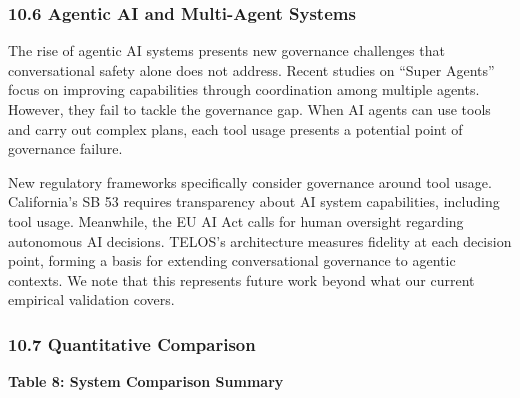 \subsubsection{10.6 Agentic AI and Multi-Agent
Systems}\label{agentic-ai-and-multi-agent-systems}

The rise of agentic AI systems presents new governance challenges that
conversational safety alone does not address. Recent studies on ``Super
Agents'' focus on improving capabilities through coordination among
multiple agents. However, they fail to tackle the governance gap. When
AI agents can use tools and carry out complex plans, each tool usage
presents a potential point of governance failure.

New regulatory frameworks specifically consider governance around tool
usage. California's SB 53 requires transparency about AI system
capabilities, including tool usage. Meanwhile, the EU AI Act calls for
human oversight regarding autonomous AI decisions. TELOS's architecture
measures fidelity at each decision point, forming a basis for extending
conversational governance to agentic contexts. We note that this
represents future work beyond what our current empirical validation
covers.

\subsubsection{10.7 Quantitative
Comparison}\label{quantitative-comparison}

\textbf{Table 8: System Comparison Summary}

